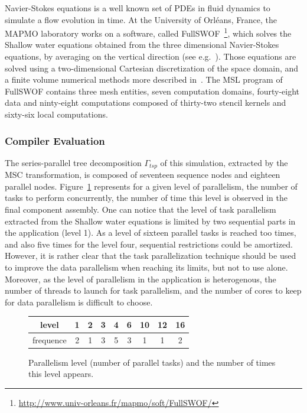 Navier-Stokes equations is a well known set of PDEs in fluid dynamics to simulate a flow evolution in time. At the University of Orl\'eans, France, the MAPMO laboratory works on a software, called FullSWOF~\footnote{\url{http://www.univ-orleans.fr/mapmo/soft/FullSWOF/}}, which solves the Shallow water equations obtained from the three dimensional Navier-Stokes equations, by averaging on the vertical direction (see e.g.~\cite{Ferrari2004}). Those equations are solved using a two-dimensional Cartesian discretization of the space domain, and a finite volume numerical methods more described in~\cite{CPE:CPE3494}. The MSL program of FullSWOF contains three mesh entities, seven computation domains, fourty-eight data and ninty-eight computations composed of thirty-two stencil kernels and sixty-six local computations.

\subsubsection*{Compiler Evaluation}

The series-parallel tree decomposition $\Gamma_{tsp}$ of this simulation, extracted by the MSC transformation, is composed of seventeen sequence nodes and eighteen parallel nodes. Figure~\ref{fig:freq} represents for a given level of parallelism, \ie the number of tasks to perform concurrently, the number of time this level is observed in the final component assembly. One can notice that the level of task parallelism extracted from the Shallow water equations is limited by two sequential parts in the application (level 1). As a level of sixteen parallel tasks is reached too times, and also five times for the level four, sequential restrictions could be amortized. However, it is rather clear that the task parallelization technique should be used to improve the data parallelism when reaching its limits, but not to use alone. Moreover, as the level of parallelism in the application is heterogenous, the number of threads to launch for task parallelism, and the number of cores to keep for data parallelism is difficult to choose.

\begin{figure}[!h]
 \begin{center}
 \begin{tabular}{c|c|c|c|c|c|c|c|c|}
   level & 1 & 2 & 3 & 4 & 6 & 10 & 12 & 16\\
   \hline
   frequence & 2 & 1 & 3 & 5 & 3 & 1 & 1 & 2\\
 \end{tabular}
\caption{Parallelism level (number of parallel tasks) and the number of times this level appears.}
\label{fig:freq}
 \end{center}
\end{figure}

